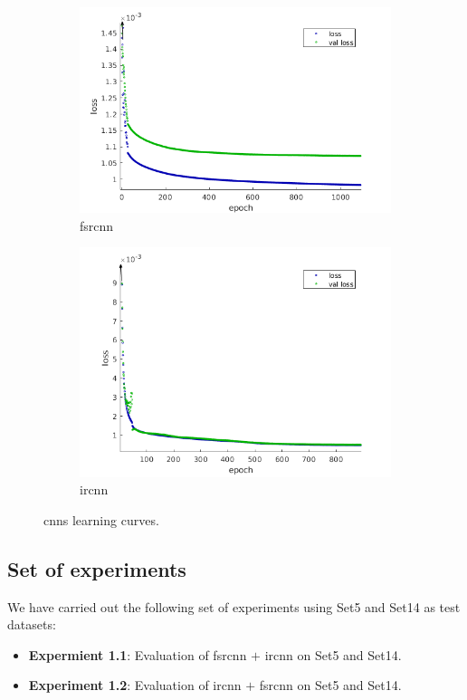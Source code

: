 \begin{figure}[h]
	\centering
	\begin{subfigure}{0.4\textwidth}
		\includegraphics[width=\textwidth]{images/fsrcnn_train.png}
		\caption{\gls{fsrcnn}}
	\end{subfigure}
	\begin{subfigure}{0.4\textwidth}
		\includegraphics[width=\textwidth]{images/ircnn_train.png}
		\caption{\gls{ircnn}}
	\end{subfigure}
	\caption{\glspl{cnn} learning curves.}
	\label{fig:training}
\end{figure}

\subsection{Set of experiments}
We have carried out the following set of experiments using Set5 \cite{SET5} and Set14 \cite{SET14} as test datasets:
\begin{itemize}
	\item \textbf{Expermient 1.1}: Evaluation of \gls{fsrcnn} $+$ \gls{ircnn} on Set5 and Set14.
	\item \textbf{Experiment 1.2}: Evaluation of \gls{ircnn} $+$ \gls{fsrcnn} on Set5 and Set14.
\end{itemize}

